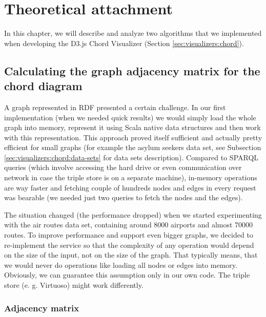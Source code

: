 \chapter{Theoretical attachment}
\label{chap:theoretical-attachment}

In this chapter, we will describe and analyze two algorithms that we implemented when developing the D3.js Chord Visualizer (Section \ref{sec:visualizers:chord}).

\section{Calculating the graph adjacency matrix for the chord diagram}

A graph represented in RDF presented a certain challenge. In our first implementation (when we needed quick results) we would simply load the whole graph into memory, represent it using Scala native data structures and then work with this representation. This approach proved itself sufficient and actually pretty efficient for small graphs (for example the asylum seekers data set, see Subsection \ref{sec:visualizers:chord:data-sets} for data sets description). Compared to SPARQL queries (which involve 
accessing the hard drive or even communication over network in case the triple store is on a separate machine), in-memory operations are way faster and fetching couple of hundreds nodes and edges in every request was bearable (we needed just two queries to fetch the nodes and the edges).

The situation changed (the performance dropped) when we started experimenting with the air routes data set, containing around 8000 airports and almost 70000 routes. To improve performance and support even bigger graphs, we decided to re-implement the service so that the complexity of any operation would depend on the size of the input, not on the size of the graph. That typically means, that we would never do operations like loading all nodes or edges into memory. Obviously, we can guarantee this assumption only in our own code. The triple store (e. g. Virtuoso) might work differently.

\subsection{Adjacency matrix}


